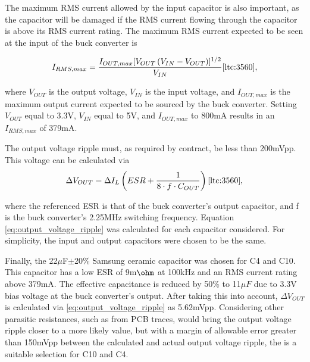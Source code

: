 The maximum RMS current allowed by the input capacitor is also important, as the capacitor will be damaged if the RMS current flowing through the capacitor is above its RMS current rating. The maximum RMS current expected to be seen at the input of the buck converter is  

\begin{equation}
\label{eq:rms_max}
    I_{RMS,max} = \frac{I_{OUT,max}[V_{OUT}\left(V_{IN}-V_{OUT}\right)]^{1/2}}{V_{IN}} \cite{ltc:3560},
\end{equation}

where $V_{OUT}$ is the output voltage, $V_{IN}$ is the input voltage, and $I_{OUT,max}$ is the maximum output current expected to be sourced by the buck converter. Setting $V_{OUT}$ equal to 3.3V, $V_{IN}$ equal to 5V, and $I_{OUT,max}$ to 800mA results in an $I_{RMS,max}$ of 379mA. 

The output voltage ripple must, as required by contract, be less than 200mVpp. This voltage can be calculated via 
\begin{equation}
\label{eq:output_voltage_ripple}
    {\Delta}V_{OUT} = {\Delta}I_{L}\left(ESR + \frac{1}{8\cdot f \cdot C_{OUT}} \right) \cite{ltc:3560},
\end{equation}

where the referenced ESR is that of the buck converter's output capacitor, and f is the buck converter's 2.25MHz switching frequency. Equation \ref{eq:output_voltage_ripple} was calculated for each capacitor considered. For simplicity, the input and output capacitors were chosen to be the same.

Finally, the 22$\mu$F$\pm$20\% Samsung \DIFdelbegin {}\DIFdelend \DIFaddbegin {}\DIFaddend ceramic capacitor was chosen for C4 and C10. This capacitor has a low ESR of 9m$\ohm$ at 100kHz and an RMS current rating above 379mA. The effective capacitance is reduced by 50\% to 11$\mu{F}$ due to 3.3V bias voltage at the buck converter's output. After taking this into account, ${\Delta}V_{OUT}$ is calculated via \ref{eq:output_voltage_ripple} as 5.62mVpp. Considering other parasitic resistances, such as from PCB traces, would bring the output voltage ripple closer to a more likely value, but with a margin of allowable error greater than 150mVpp between the calculated and actual output voltage ripple, the \DIFdelbegin {}\DIFdelend \DIFaddbegin {}\DIFaddend is a suitable selection for C10 and C4. 

